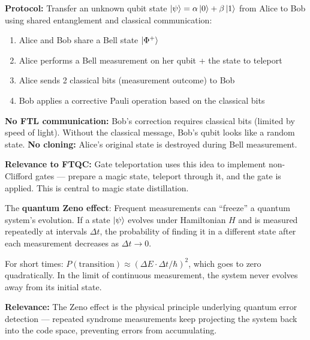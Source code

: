 \documentclass[11pt,a4paper]{article}
\begin{document}
\begin{answerbox}
\textbf{Protocol:} Transfer an unknown qubit state $\ket{\psi} = \alpha\ket{0} + \beta\ket{1}$ from Alice to Bob using shared entanglement and classical communication:
\begin{enumerate}
    \item Alice and Bob share a Bell state $\ket{\Phi^+}$
    \item Alice performs a Bell measurement on her qubit + the state to teleport
    \item Alice sends 2 classical bits (measurement outcome) to Bob
    \item Bob applies a corrective Pauli operation based on the classical bits
\end{enumerate}
\textbf{No FTL communication:} Bob's correction requires classical bits (limited by speed of light). Without the classical message, Bob's qubit looks like a random state. \textbf{No cloning:} Alice's original state is destroyed during Bell measurement.

\textbf{Relevance to FTQC:} Gate teleportation uses this idea to implement non-Clifford gates --- prepare a magic state, teleport through it, and the gate is applied. This is central to magic state distillation.
\end{answerbox}

\begin{answerbox}
The \textbf{quantum Zeno effect}: Frequent measurements can ``freeze'' a quantum system's evolution. If a state $\ket{\psi}$ evolves under Hamiltonian $H$ and is measured repeatedly at intervals $\Delta t$, the probability of finding it in a different state after each measurement decreases as $\Delta t \to 0$.

For short times: $P(\text{transition}) \approx (\Delta E \cdot \Delta t / \hbar)^2$, which goes to zero quadratically. In the limit of continuous measurement, the system never evolves away from its initial state.

\textbf{Relevance:} The Zeno effect is the physical principle underlying quantum error detection --- repeated syndrome measurements keep projecting the system back into the code space, preventing errors from accumulating.
\end{answerbox}
\end{document}
